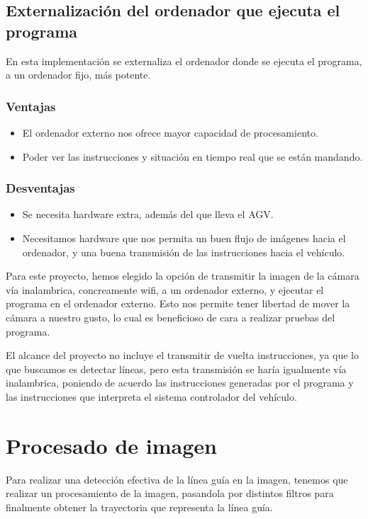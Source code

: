 \subsection{Externalización del ordenador que ejecuta el programa} 

En esta implementación se externaliza el ordenador donde se ejecuta el programa, a un ordenador fijo, más potente.
\subsubsection{Ventajas}
\begin{itemize}
	\item El ordenador externo nos ofrece mayor capacidad de procesamiento.
	
	\item Poder ver las instrucciones y situación en tiempo real que se están mandando.
	
\end{itemize}

\subsubsection{Desventajas}
\begin{itemize}
	\item Se necesita hardware extra, además del que lleva el AGV.
	
	\item Necesitamos hardware que nos permita un buen flujo de imágenes hacia el ordenador, y una buena transmisión de las instrucciones hacia el vehículo.
	
\end{itemize} 

Para este proyecto, hemos elegido la opción de transmitir la imagen de la cámara vía inalambrica, concreamente wifi, a un ordenador externo, y ejecutar el programa en el ordenador externo. Esto nos permite tener libertad de mover la cámara a nuestro gusto, lo cual es beneficioso de cara a realizar pruebas del programa.

El alcance del proyecto no incluye el transmitir de vuelta instrucciones, ya que lo que buscamos es detectar líneas, pero esta transmisión se haría igualmente vía inalambrica, poniendo de acuerdo las instrucciones generadas por el programa y las instrucciones que interpreta el sistema controlador del vehículo.


\section{Procesado de imagen}
Para realizar una detección efectiva de la línea guía en la imagen, tenemos que realizar un procesamiento de la imagen, pasandola por distintos filtros para finalmente obtener la trayectoria que representa la línea guía.

